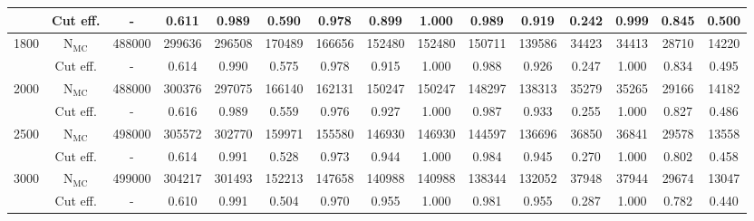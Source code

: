 \begin{table}[H]
{{\begin{tabular*}{250mm}{@{\extracolsep{\fill}}c|cccccccccccccc}
             & Cut eff.               & -      & 0.611  & 0.989   & 0.590   & 0.978     & 0.899      & 1.000    & 0.989         & 0.919                    & 0.242                     & 0.999                 & 0.845                               & 0.500\\
        \hline
        1800 & $\text{N}_{\text{MC}}$ & 488000 & 299636 & 296508  & 170489  & 166656    & 152480     & 152480   & 150711        & 139586                   & 34423                     & 34413                 & 28710                                    & 14220\\
             & Cut eff.               & -      & 0.614  & 0.990   & 0.575   & 0.978     & 0.915      & 1.000    & 0.988         & 0.926                    & 0.247                     & 1.000                 & 0.834                               & 0.495\\
        \hline
        2000 & $\text{N}_{\text{MC}}$ & 488000 & 300376 & 297075  & 166140  & 162131    & 150247     & 150247   & 148297        & 138313                   & 35279                     & 35265                 & 29166                                    & 14182\\
             & Cut eff.               & -      & 0.616  & 0.989   & 0.559   & 0.976     & 0.927      & 1.000    & 0.987         & 0.933                    & 0.255                     & 1.000                 & 0.827                               & 0.486\\
        \hline
        2500 & $\text{N}_{\text{MC}}$ & 498000 & 305572 & 302770  & 159971  & 155580    & 146930     & 146930   & 144597        & 136696                   & 36850                     & 36841                 & 29578                                    & 13558\\
             & Cut eff.               & -      & 0.614  & 0.991   & 0.528   & 0.973     & 0.944      & 1.000    & 0.984         & 0.945                    & 0.270                     & 1.000                 & 0.802         
                                   & 0.458\\
        \hline
        3000 & $\text{N}_{\text{MC}}$ & 499000 & 304217 & 301493  & 152213  & 147658    & 140988     & 140988   & 138344        & 132052                   & 37948                     & 37944                 & 29674                                    & 13047\\
             & Cut eff.               & -      & 0.610  & 0.991   & 0.504   & 0.970     & 0.955      & 1.000    & 0.981         & 0.955                    & 0.287                     & 1.000                 & 0.782                               & 0.440\\

\end{tabular*}}}
\end{table}

